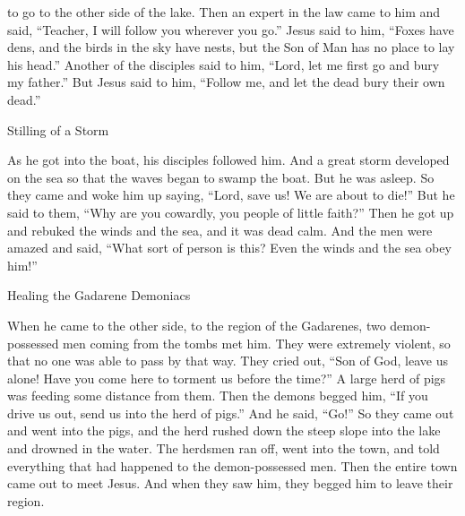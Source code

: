 {to go
to
the other side of the lake.
Then
an expert in the law
came
to him
and said,
“Teacher,
I will follow
you
wherever
you go.”
Jesus
said
to him,
“Foxes
have
dens,
and
the birds
in the sky
have nests,
but
the Son
of Man
has
no
place
to lay
his head.”
Another
of the disciples
said
to him,
“Lord,
let
me
first
go
and
bury
my
father.”
But
Jesus
said
to him,
“Follow
me,
and
let
the dead
bury
their own
dead.”
\par }{\SH Stilling of a Storm
\par }{\PP {}As
he got
into
the boat,
his
disciples
followed
him.
And
a great
storm
developed
on
the sea
so
that the waves
began to swamp
the boat.
But
he
was asleep.
So
they came
and woke
him
up
saying,
“Lord,
save
us! We are about to die!”
But
he said
to them,
“Why
are you
cowardly,
you people of little faith?” Then
he got up
and rebuked
the winds
and
the sea,
and
it was
dead
calm.
And
the men
were amazed
and said, “What sort of person
is
this? Even
the winds
and
the sea
obey
him!”
\par }{\SH Healing the Gadarene Demoniacs
\par }{\PP {}When
he
came
to
the other side,
to
the region
of the Gadarenes,
two
demon-possessed men
coming
from
the tombs
met him. They were extremely
violent,
so that
no
one
was able
to pass
by
that
way.
They cried out,
“Son
of God,
leave us
alone! Have you come
here
to torment
us
before
the time?”
A large
herd
of pigs
was feeding
some distance
from
them.
Then
the demons
begged
him, “If
you drive
us
out,
send
us
into
the herd
of pigs.”
And
he said, “Go!” So
they came out
and went
into
the pigs,
and
the herd
rushed down
the steep slope
into
the lake
and
drowned
in
the water.
The
herdsmen
ran off,
went
into
the town,
and told
everything
that had happened to the demon-possessed men.
Then
the entire
town
came out
to
meet
Jesus.
And
when
they saw
him,
they begged
him to leave
their
region.

}
